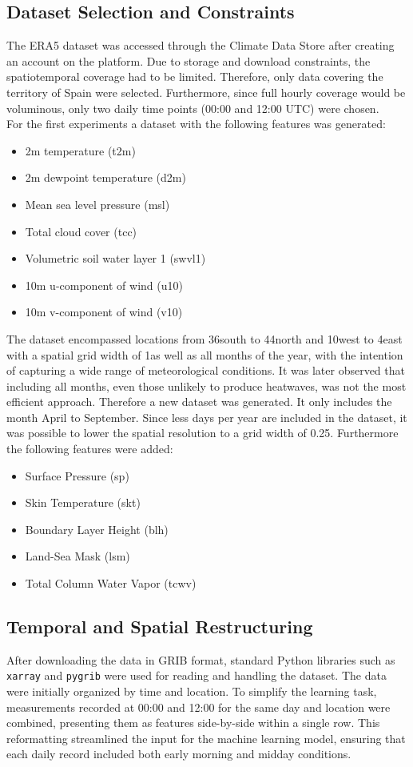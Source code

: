 \documentclass[conference,9pt]{IEEEtran}
\begin{document}
\subsection{Dataset Selection and Constraints}
\label{sec:DS}
The ERA5 dataset was accessed through the Climate Data Store after creating an account on the platform. Due to storage and download constraints, the spatiotemporal coverage had to be limited. Therefore, only data covering the territory of Spain were selected. Furthermore, since full hourly coverage would be voluminous, only two daily time points (00:00 and 12:00 UTC) were chosen.\\
For the first experiments a dataset with the following features was generated:
\begin{itemize}
    \item 2m temperature (t2m)
    \item 2m dewpoint temperature (d2m)
    \item Mean sea level pressure (msl)
    \item Total cloud cover (tcc)
    \item Volumetric soil water layer 1 (swvl1)
    \item 10m u-component of wind (u10)
    \item 10m v-component of wind (v10)
\end{itemize}
The dataset encompassed locations from 36\degree south to 44\degree north and 10\degree west to 4\degree east with a spatial grid width of 1\degree as well as all months of the year, with the intention of capturing a wide range of meteorological conditions. It was later observed that including all months, even those unlikely to produce heatwaves, was not the most efficient approach. Therefore a new dataset was generated. It only includes the month April to September. Since less days per year are included in the dataset, it was possible to lower the spatial resolution to a grid width of 0.25\degree. Furthermore the following features were added:
\begin{itemize}
    \item Surface Pressure (sp)
    \item Skin Temperature (skt)
    \item Boundary Layer Height (blh)
    \item Land-Sea Mask (lsm)
    \item Total Column Water Vapor (tcwv)
\end{itemize}

\subsection{Temporal and Spatial Restructuring}
After downloading the data in GRIB format, standard Python libraries such as \texttt{xarray} and \texttt{pygrib} were used for reading and handling the dataset. The data were initially organized by time and location. To simplify the learning task, measurements recorded at 00:00 and 12:00 for the same day and location were combined, presenting them as features side-by-side within a single row. This reformatting streamlined the input for the machine learning model, ensuring that each daily record included both early morning and midday conditions.
\end{document}
